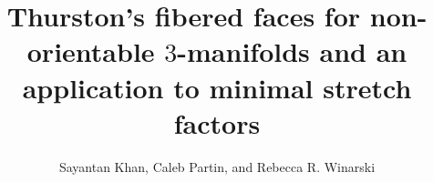 \documentclass[11pt, notitlepage]{article}
\title{Thurston's fibered faces for non-orientable $3$-manifolds and an application to minimal stretch factors}
\author{Sayantan Khan, Caleb Partin, and Rebecca R. Winarski}
\date{}
\theoremstyle{definition}
\theoremstyle{definition}
\theoremstyle{definition}
\theoremstyle{remark}
\theoremstyle{definition}
\begin{document}
\maketitle



\listoftodos





% 



\end{document}
